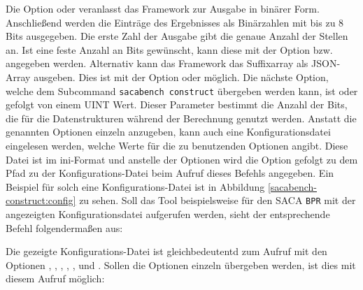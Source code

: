{Die Option  oder  veranlasst das Framework zur Ausgabe in binärer Form.
Anschließend werden die Einträge des Ergebnisses als Binärzahlen mit bis zu 8 Bits ausgegeben. 
Die erste Zahl der Ausgabe gibt die genaue Anzahl der Stellen an.
Ist eine feste Anzahl an Bits gewünscht, kann diese mit der Option  bzw.  angegeben werden.
Alternativ kann das Framework das Suffixarray als JSON-Array ausgeben. 
Dies ist mit der Option  oder  möglich.
Die nächste Option, welche dem Subcommand \texttt{sacabench construct} übergeben werden kann, ist  oder  gefolgt von einem UINT Wert. 
Dieser Parameter bestimmt die Anzahl der Bits, die für die Datenstrukturen während der Berechnung genutzt werden.
Anstatt die genannten Optionen einzeln anzugeben, kann auch eine Konfigurationsdatei eingelesen werden, welche Werte für die zu benutzenden Optionen angibt.
Diese Datei ist im ini-Format und anstelle der Optionen wird die Option  gefolgt zu dem Pfad zu der Konfigurations-Datei beim Aufruf dieses Befehls angegeben.
Ein Beispiel für solch eine Konfigurations-Datei ist in Abbildung \ref{sacabench-construct:config} zu sehen.
Soll das Tool beispielsweise für den SACA \texttt{BPR} mit der angezeigten Konfigurationsdatei aufgerufen werden, sieht der entsprechende Befehl folgendermaßen aus:


Die gezeigte Konfigurations-Datei ist gleichbedeutentd zum Aufruf mit den Optionen , , , , ,  und .
Sollen die Optionen einzeln übergeben werden, ist dies mit diesem Aufruf möglich:

\par
}

